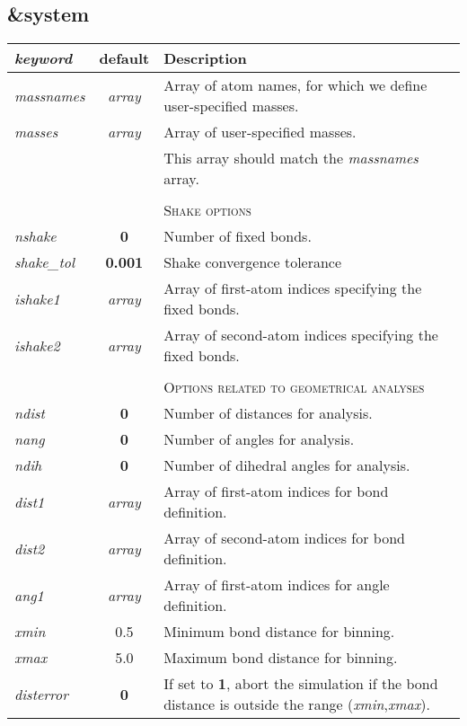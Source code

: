 \documentclass[12pt,a4paper]{article}
\begin{document}
\subsection{\&system}
\begin{tabular}{lcp{13cm}}
\textit{keyword} & \textbf{default} & Description \\
\hline 
\textit{massnames} & \textit{array} & Array of atom names, for which we define user-specified masses. \\
\textit{masses} & \textit{array} &  Array of user-specified masses. \\
& & This array should match the \textit{massnames} array. \\
& & \\

& & \textsc{Shake options} \\
\textit{nshake} & \textbf{0} & Number of fixed bonds. \\
\textit{shake\_tol} & \textbf{0.001} & Shake convergence tolerance \\
\textit{ishake1} & \textit{array} & Array of first-atom indices specifying the fixed bonds.  \\
\textit{ishake2} & \textit{array} & Array of second-atom indices specifying the fixed bonds. \\
& & \\
& & \textsc{Options related to geometrical analyses} \\
\textit{ndist}& \textbf{0} & Number of distances for analysis. \\
\textit{nang}& \textbf{0} & Number of angles for analysis. \\
\textit{ndih}& \textbf{0} & Number of dihedral angles for analysis. \\

\textit{dist1} & \textit{array} & Array of first-atom indices for bond definition.\\
\textit{dist2} & \textit{array} & Array of second-atom indices for bond definition.\\
\textit{ang1} & \textit{array} & Array of first-atom indices for angle definition.\\

\textit{xmin} & 0.5 & Minimum bond distance for binning. \\
\textit{xmax} & 5.0 & Maximum bond distance for binning. \\
\textit{disterror} & \textbf{0} & If set to \textbf{1}, abort the simulation
if the bond distance is outside the range (\textit{xmin},\textit{xmax}).\\ 


\end{tabular}
\end{document}
